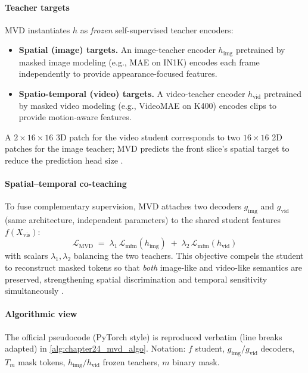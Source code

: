 \begin{enrichment}
\begin{enrichment}
            \paragraph{Teacher targets}
            \label{par:chapter24_mvd_targets}
            MVD instantiates $h$ as \emph{frozen} self-supervised teacher encoders:
            \begin{itemize}
                \item \textbf{Spatial (image) targets.} An image-teacher encoder $h_{\text{img}}$ pretrained by masked image modeling (e.g., MAE on IN1K) encodes each frame independently to provide appearance-focused features.
                \item \textbf{Spatio-temporal (video) targets.} A video-teacher encoder $h_{\text{vid}}$ pretrained by masked video modeling (e.g., VideoMAE on K400) encodes clips to provide motion-aware features.
            \end{itemize}
            A $2\times16\times16$ 3D patch for the video student corresponds to two $16\times16$ 2D patches for the image teacher; MVD predicts the front slice’s spatial target to reduce the prediction head size \cite{wang2023_mvd}.
            
            \paragraph{Spatial–temporal co-teaching}
            \label{par:chapter24_mvd_coteach}
            To fuse complementary supervision, MVD attaches two decoders $g_{\text{img}}$ and $g_{\text{vid}}$ (same architecture, independent parameters) to the shared student features $f(X_{\text{vis}})$:
            \begin{equation}
                \mathcal{L}_{\text{MVD}} \;=\; \lambda_1\,\mathcal{L}_{\text{mfm}}(h_{\text{img}}) \;+\; \lambda_2\,\mathcal{L}_{\text{mfm}}(h_{\text{vid}})
                \label{eq:chapter24_mvd_total}
            \end{equation}
            with scalars $\lambda_1,\lambda_2$ balancing the two teachers. This objective compels the student to reconstruct masked tokens so that \emph{both} image-like and video-like semantics are preserved, strengthening spatial discrimination and temporal sensitivity simultaneously \cite{wang2023_mvd}.
            
            \newpage
            
            \paragraph{Algorithmic view}
            \label{par:chapter24_mvd_algo}
            The official pseudocode (PyTorch style) is reproduced verbatim (line breaks adapted) in \ref{alg:chapter24_mvd_algo}. Notation: $f$ student, $g_{\text{img}}/g_{\text{vid}}$ decoders, $T_m$ mask tokens, $h_{\text{img}}/h_{\text{vid}}$ frozen teachers, $m$ binary mask.
            

\end{enrichment}
\end{enrichment}
